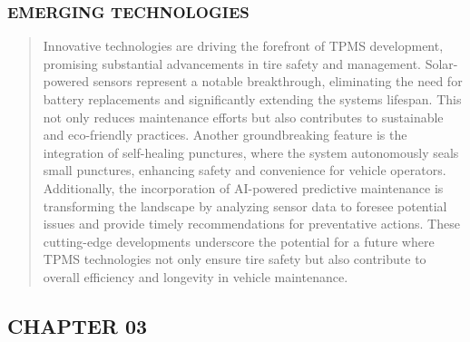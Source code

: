 \documentclass[
]{article}
\begin{document}
\newpage
\hypertarget{emerging-technologies}{%
\subsubsection{EMERGING TECHNOLOGIES}\label{emerging-technologies}}

\begin{quote}
Innovative technologies are driving the forefront of TPMS development,
promising substantial advancements in tire safety and management.
Solar-powered sensors represent a notable breakthrough, eliminating the
need for battery replacements and significantly extending the
system\textquotesingle s lifespan. This not only reduces maintenance
efforts but also contributes to sustainable and eco-friendly practices.
Another groundbreaking feature is the integration of self-healing
punctures, where the system autonomously seals small punctures,
enhancing safety and convenience for vehicle operators. Additionally,
the incorporation of AI-powered predictive maintenance is transforming
the landscape by analyzing sensor data to foresee potential issues and
provide timely recommendations for preventative actions. These
cutting-edge developments underscore the potential for a future where
TPMS technologies not only ensure tire safety but also contribute to
overall efficiency and longevity in vehicle maintenance.
\end{quote}
\newpage
\hypertarget{chapter-03}{%
\subsection{CHAPTER 03}\label{chapter-03}}
\end{document}

